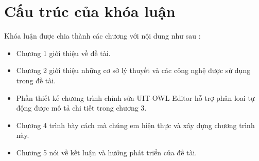 \section{Cấu trúc của khóa luận}
Khóa luận được chia thành các chương với nội dung như sau : 
\begin{itemize}
\item Chương 1 giới thiệu về đề tài.
\item Chương 2 giới thiệu những cơ sở lý thuyết và các công nghệ được sử dụng trong đề tài.
\item Phần thiết kế chương trình chỉnh sửa UIT-OWL Editor hỗ trợ phân loai tự động được mô tả chi tiết trong chương 3.
\item Chương 4 trình bày cách mà chúng em hiện thực và xây dựng chương trình này.
\item Chương 5 nói về kết luận và hướng phát triển của đề tài.
\end{itemize}
